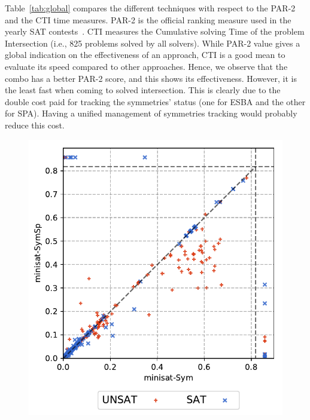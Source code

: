Table~\ref{tab:global} compares the different techniques with respect to the
PAR-2 and the CTI time measures. PAR-2 is the official ranking measure used in
the yearly SAT contests~\cite{jarvisalo2012international}. CTI measures the
Cumulative solving Time of the problem Intersection (i.e., 825 problems solved
by all solvers). While PAR-2 value gives a global indication on the
effectiveness of an approach, CTI is a good mean to evaluate its speed compared
to other approaches.
Hence, we observe that the combo has a better PAR-2 score, and this shows its
effectiveness. However, it is the least fast when coming to solved intersection.
This is clearly due to the double cost paid for tracking the symmetries' status
(one for ESBA and the other for SPA). Having a unified management of
symmetries tracking would probably reduce this cost.
\begin{center}
\begin{figure}[!htbp]
 \includegraphics[scale=0.5]{img/full-INFGB-ratio-vscosy.pdf}

\end{figure}
\end{center}
